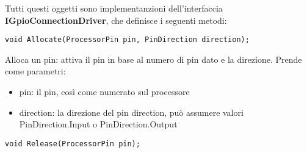 Tutti questi oggetti sono implementanzioni dell'interfaccia \textbf{IGpioConnectionDriver}, che definisce i seguenti metodi:


  


   
   
   
   
  
  
   \begin{lstlisting}[frame=none]
   void Allocate(ProcessorPin pin, PinDirection direction);
   \end{lstlisting}
    
   Alloca un pin: attiva il pin in base al numero di pin dato e la direzione.
   Prende come parametri:
   \begin{itemize}
  	 \item pin: il pin, così come numerato sul processore
  	 \item direction: la direzione del pin direction, può assumere valori PinDirection.Input o PinDirection.Output
	\end{itemize}
   


	\begin{lstlisting}[frame=none]
   void Release(ProcessorPin pin);
 	\end{lstlisting}
   
